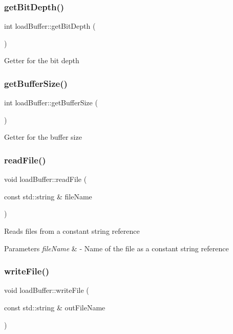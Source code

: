 \subsubsection{\texorpdfstring{get\+Bit\+Depth()}{getBitDepth()}}
{\footnotesize\ttfamily int load\+Buffer\+::get\+Bit\+Depth (\begin{DoxyParamCaption}{ }\end{DoxyParamCaption})}

Getter for the bit depth \mbox{\label{classloadBuffer_afdb86606188438cef499304c2a0af433}} 
\subsubsection{\texorpdfstring{get\+Buffer\+Size()}{getBufferSize()}}
{\footnotesize\ttfamily int load\+Buffer\+::get\+Buffer\+Size (\begin{DoxyParamCaption}{ }\end{DoxyParamCaption})}

Getter for the buffer size \mbox{\label{classloadBuffer_adfdc981dd37280f382467ecd6fb087c6}} 
\subsubsection{\texorpdfstring{read\+File()}{readFile()}}
{\footnotesize\ttfamily void load\+Buffer\+::read\+File (\begin{DoxyParamCaption}\item[{const std\+::string \&}]{file\+Name }\end{DoxyParamCaption})}

Reads files from a constant string reference 
\begin{DoxyParams}{Parameters}
{\em file\+Name} & -\/ Name of the file as a constant string reference \\
\hline
\end{DoxyParams}
\mbox{\label{classloadBuffer_a0ebc8576784119627232cff763100695}} 
\subsubsection{\texorpdfstring{write\+File()}{writeFile()}}
{\footnotesize\ttfamily void load\+Buffer\+::write\+File (\begin{DoxyParamCaption}\item[{const std\+::string \&}]{out\+File\+Name }\end{DoxyParamCaption})}

